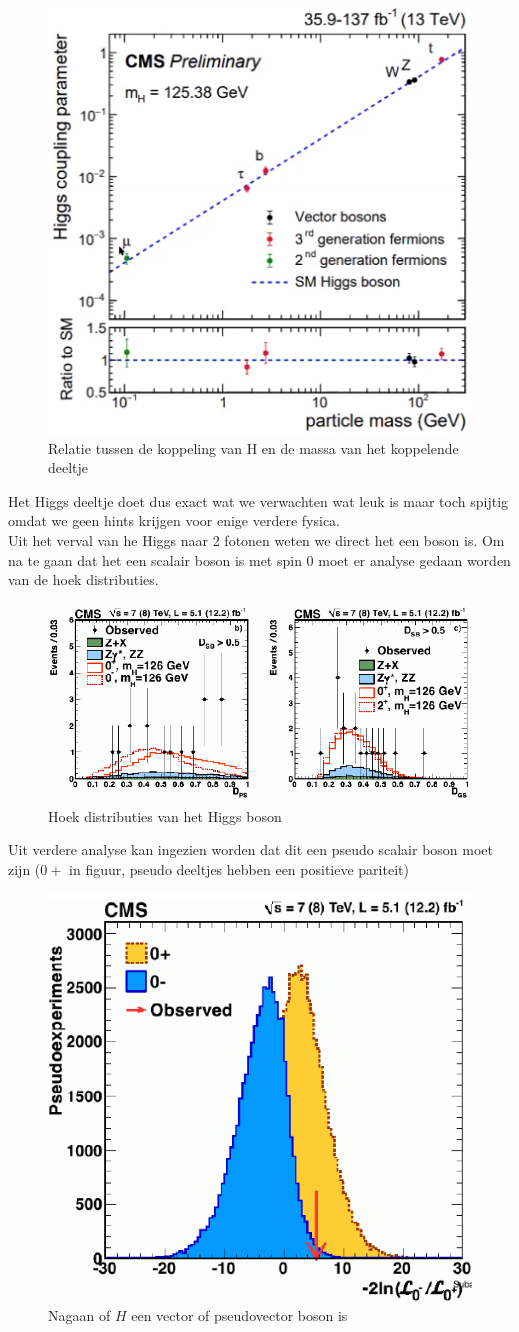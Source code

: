 \documentclass[../main.tex]{subfiles}
\begin{document}
\begin{figure}[h]
    \centering
    \includegraphics[width=0.4\linewidth]{higgs_boson/h_koppeling_massa.png}
    \caption{Relatie tussen de koppeling van H en de massa van het koppelende deeltje}%
    \label{fig:higgs_boson/h_koppeling_massa}
\end{figure}

Het Higgs deeltje doet dus exact wat we verwachten wat leuk is maar toch spijtig omdat we geen hints krijgen voor enige verdere fysica.\\
Uit het verval van he Higgs naar 2 fotonen weten we direct het een boson is. Om na te gaan dat het een scalair boson is met spin 0 moet er analyse gedaan worden van de hoek distributies.

\begin{figure}[h]
    \centering
    \includegraphics[width=0.5\linewidth]{higgs_boson/h_hoek_dist.png}
    \caption{Hoek distributies van het Higgs boson}%
    \label{fig:higgs_boson/h_hoek_dist}
\end{figure}

Uit verdere analyse kan ingezien worden dat dit een pseudo scalair boson moet zijn ($0+$ in figuur, pseudo deeltjes hebben een positieve pariteit)

\begin{figure}[h]
    \centering
    \includegraphics[width=0.5\linewidth]{higgs_boson/h_vec_boson.png}
    \caption{Nagaan of $H$ een vector of pseudovector boson is}%
    \label{fig:higgs_boson/h_vec_boson}
\end{figure}
\end{document}
